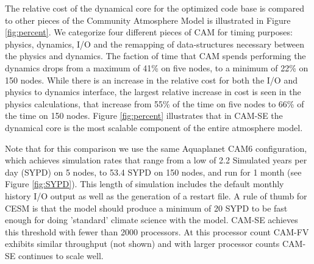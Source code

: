 \documentclass{agujournal}
\begin{document}
{The relative cost of the dynamical core for the optimized code base is compared to other pieces of the Community Atmosphere Model is illustrated in Figure \ref{fig:percent}. We categorize four different pieces of CAM for timing purposes: physics, dynamics, I/O and the remapping of data-structures necessary between the physics and dynamics.  The faction of time that CAM spends performing the dynamics drops from a maximum of 41\% on five nodes, to a minimum of 22\% on 150 nodes.  While there is an increase in the relative cost for both the I/O and physics to dynamics interface, the largest relative increase in cost is seen in the physics calculations, that increase from 55\% of the time on five nodes to 66\% of the time on 150 nodes.  Figure \ref{fig:percent} illustrates that in CAM-SE the dynamical core is the most scalable component of the entire atmosphere model.  

Note that for this comparison we use the same Aquaplanet CAM6 configuration, which achieves simulation rates that range from a low of 2.2 Simulated years per day (SYPD) on 5 nodes, to 53.4 SYPD on 150 nodes, and run for 1 month (see Figure \ref{fig:SYPD}). This length of simulation includes the default monthly history I/O output as well as the generation of a restart file. A rule of thumb for CESM is that the model should produce a minimum of 20 SYPD to be fast enough for doing 'standard' climate science with the model. CAM-SE achieves this threshold with fewer than 2000 processors. At this processor count CAM-FV exhibits similar throughput (not shown) and with larger processor counts CAM-SE continues to scale well.

}
\end{document}
